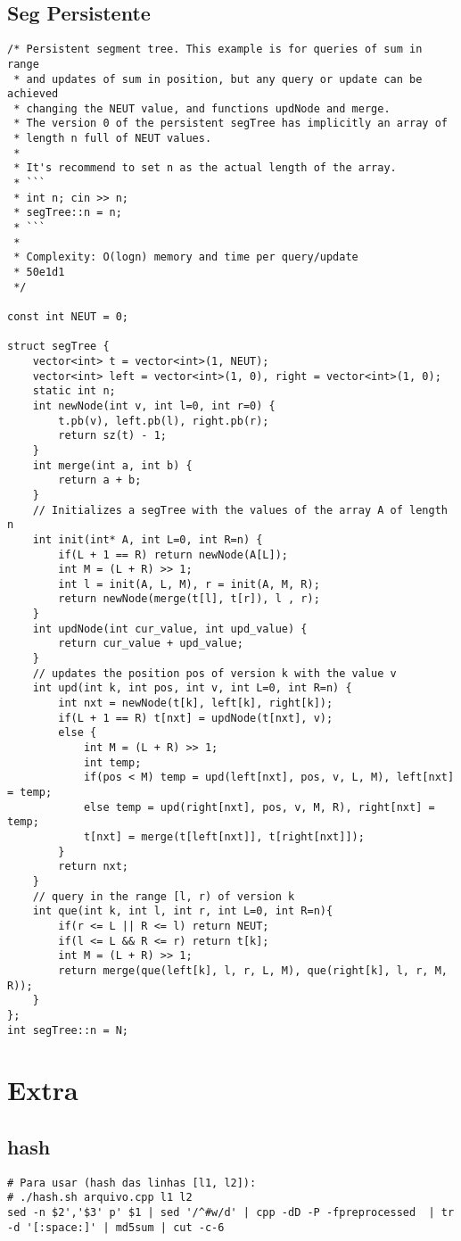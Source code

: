 \documentclass{article}
\begin{document}
\subsection{Seg Persistente}
\begin{verbatim}
/* Persistent segment tree. This example is for queries of sum in range
 * and updates of sum in position, but any query or update can be achieved
 * changing the NEUT value, and functions updNode and merge.
 * The version 0 of the persistent segTree has implicitly an array of
 * length n full of NEUT values.
 *
 * It's recommend to set n as the actual length of the array.
 * ```
 * int n; cin >> n;
 * segTree::n = n;
 * ```
 *
 * Complexity: O(logn) memory and time per query/update
 * 50e1d1
 */

const int NEUT = 0;

struct segTree {
	vector<int> t = vector<int>(1, NEUT);
	vector<int> left = vector<int>(1, 0), right = vector<int>(1, 0);
	static int n;
	int newNode(int v, int l=0, int r=0) {
		t.pb(v), left.pb(l), right.pb(r);
		return sz(t) - 1;
	}
	int merge(int a, int b) {
		return a + b;
	}
	// Initializes a segTree with the values of the array A of length n
	int init(int* A, int L=0, int R=n) {
		if(L + 1 == R) return newNode(A[L]);
		int M = (L + R) >> 1;
		int l = init(A, L, M), r = init(A, M, R);
		return newNode(merge(t[l], t[r]), l , r);
	}
	int updNode(int cur_value, int upd_value) {
		return cur_value + upd_value;
	}
	// updates the position pos of version k with the value v
	int upd(int k, int pos, int v, int L=0, int R=n) {
		int nxt = newNode(t[k], left[k], right[k]);
		if(L + 1 == R) t[nxt] = updNode(t[nxt], v);
		else {
			int M = (L + R) >> 1;
			int temp;
			if(pos < M) temp = upd(left[nxt], pos, v, L, M), left[nxt] = temp;
			else temp = upd(right[nxt], pos, v, M, R), right[nxt] = temp;
			t[nxt] = merge(t[left[nxt]], t[right[nxt]]);
		}
		return nxt;
	}
	// query in the range [l, r) of version k
	int que(int k, int l, int r, int L=0, int R=n){
		if(r <= L || R <= l) return NEUT;
		if(l <= L && R <= r) return t[k];
		int M = (L + R) >> 1;
		return merge(que(left[k], l, r, L, M), que(right[k], l, r, M, R));
	}
};
int segTree::n = N;
\end{verbatim}
\section{Extra}
\subsection{hash}
\begin{verbatim}
# Para usar (hash das linhas [l1, l2]):
# ./hash.sh arquivo.cpp l1 l2
sed -n $2','$3' p' $1 | sed '/^#w/d' | cpp -dD -P -fpreprocessed  | tr -d '[:space:]' | md5sum | cut -c-6
\end{verbatim}
\end{document}
